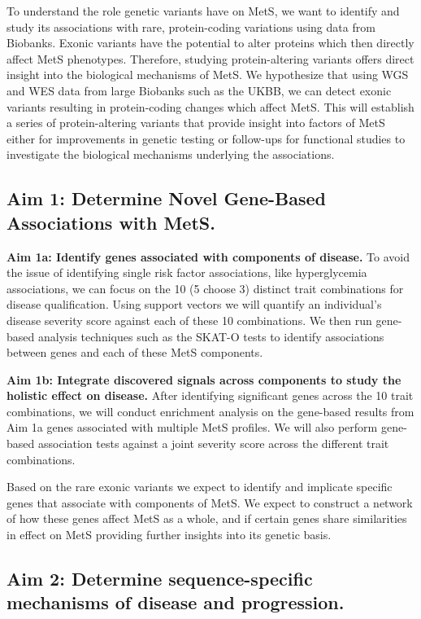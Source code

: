 \documentclass[11pt]{article}
\begin{document}
To understand the role genetic variants have on MetS, we want to identify and study its associations with rare, protein-coding variations using data from Biobanks. Exonic variants have the potential to alter proteins which then directly affect MetS phenotypes. Therefore, studying protein-altering variants offers direct insight into the biological mechanisms of MetS. We hypothesize that using WGS and WES data from large Biobanks such as the UKBB, we can detect exonic variants resulting in protein-coding changes which affect MetS. This will establish a series of protein-altering variants that provide insight into factors of MetS either for improvements in genetic testing or follow-ups for functional studies to investigate the biological mechanisms underlying the associations.

\subsection*{Aim 1: Determine Novel Gene-Based Associations with MetS.}

\textbf{Aim 1a: Identify genes associated with components of disease.} To avoid the issue of identifying single risk factor associations, like hyperglycemia associations, we can focus on the 10 (5 choose 3) distinct trait combinations for disease qualification. Using support vectors we will quantify an individual's disease severity score against each of these 10 combinations. We then run gene-based analysis techniques such as the SKAT-O tests to identify associations between genes and each of these MetS components.

\textbf{Aim 1b: Integrate discovered signals across components to study the holistic effect on disease.} After identifying significant genes across the 10 trait combinations, we will conduct enrichment analysis on the gene-based results from Aim 1a genes associated with multiple MetS profiles. We will also perform gene-based association tests against a joint severity score across the different trait combinations.

Based on the rare exonic variants we expect to identify and implicate specific genes that associate with components of MetS. We expect to construct a network of how these genes affect MetS as a whole, and if certain genes share similarities in effect on MetS providing further insights into its genetic basis.

\subsection*{Aim 2: Determine sequence-specific mechanisms of disease and progression.}
\end{document}
